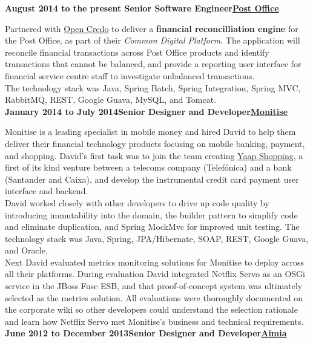 \documentclass[a4paper,12pt]{article}
\newcommand{\head}[1]{\begin{center}{\large{\textbf{\sc{#1}}}}\nopagebreak\end{center}}
\newcommand{\clientwork}[3]{\textbf{#1\hfill#3\hfill#2}\nopagebreak}
\begin{document}
\head{Career History}

\clientwork{August 2014 to the present }{\href{http://www.postoffice.co.uk/}{Post Office}}{Senior Software Engineer}

Partnered with \href{http://www.opencredo.com/}{Open Credo} to deliver a \textbf{financial reconcilliation engine} for the Post Office, as part of their \emph{Common Digital Platform}. The application will reconcile financial transactions across Post Office products and identify transactions that cannot be balanced, and provide a reporting user interface for financial service centre staff to investigate unbalanced transactions.\\

The technology stack was Java, Spring Batch, Spring Integration, Spring MVC, RabbitMQ, REST, Google Guava, MySQL, and Tomcat.\\

\clientwork{January 2014 to July 2014}{\href{http://www.monitise.com/}{Monitise}}{Senior Designer and Developer}

Monitise is a leading specialist in mobile money and hired David to help them deliver their financial technology products focusing on mobile banking, payment, and shopping. David's first task was to join the team creating \href{http://www.yaapshopping.com/}{Yaap Shopping}, a first of its kind venture between a telecoms company (Telef\'onica) and a bank (Santander and Caixa), and develop the instrumental credit card payment user interface and backend.\\

David worked closely with other developers to drive up code quality by introducing immutability into the domain, the builder pattern to simplify code and eliminate duplication, and Spring MockMvc for improved unit testing. The technology stack was Java, Spring, JPA/Hibernate, SOAP, REST, Google Guava, and Oracle.\\

Next David evaluated metrics monitoring solutions for Monitise to deploy across all their platforms. During evaluation David integrated Netflix Servo as an OSGi service in the JBoss Fuse ESB, and that proof-of-concept system was ultimately selected as the metrics solution. All evaluations were thoroughly documented on the corporate wiki so other developers could understand the selection rationale and learn how Netflix Servo met Monitise's business and technical requirements.\\

\clientwork{June 2012 to December 2013}{\href{http://www.aimia.com/}{Aimia}}{Senior Designer and Developer}
\end{document}
